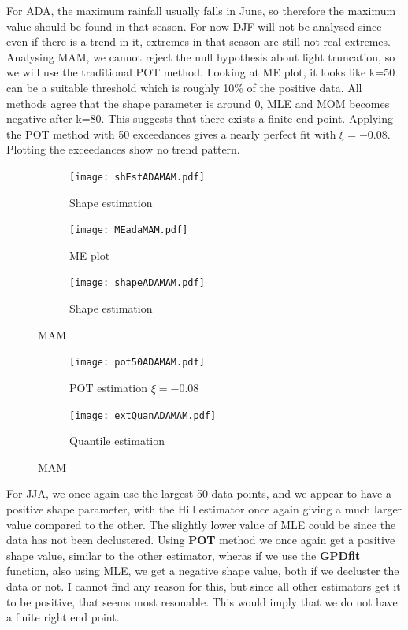 \documentclass{article}
\begin{document}
	For ADA, the maximum rainfall usually falls in June, so therefore the maximum value should be found in that season. For now DJF will not be analysed since even if there is a trend in it, extremes in that season are still not real extremes. Analysing MAM, we cannot reject the null hypothesis about light truncation, so we will use the traditional POT method. Looking at ME plot, it looks like k=50 can be a suitable threshold which is roughly 10\% of the positive data. All methods agree that the shape parameter is around 0, MLE and MOM becomes negative after k=80. This suggests that there exists a finite end point. Applying the POT method with 50 exceedances gives a nearly perfect fit with $\xi = -0.08$. Plotting the exceedances show no trend pattern.
	\begin{figure}
		\begin{subfigure}{0.33\textwidth}
			\texttt{[image: shEstADAMAM.pdf]}
			\caption{Shape estimation}
		\end{subfigure}%
		\begin{subfigure}{0.33\textwidth}
			\texttt{[image: MEadaMAM.pdf]}
			\caption{ME plot}
		\end{subfigure}
		\begin{subfigure}{0.33\textwidth}
			\texttt{[image: shapeADAMAM.pdf]}
			\caption{Shape estimation}
		\end{subfigure}
	\caption{MAM}
	\end{figure}

	\begin{figure}[H]
		\centering
		\begin{subfigure}{0.5\textwidth}
			\texttt{[image: pot50ADAMAM.pdf]}
			\caption{POT estimation $\xi = -0.08$}
		\end{subfigure}%
		\begin{subfigure}{0.5\textwidth}
			\texttt{[image: extQuanADAMAM.pdf]}
			\caption{Quantile estimation}
		\end{subfigure}
	\caption{MAM}
	\end{figure}

	For JJA, we once again use the largest 50 data points, and we appear to have a positive shape parameter, with the Hill estimator once again giving a much larger value compared to the other. The slightly lower value of MLE could be since the data has not been declustered. Using \textbf{POT} method we once again get a positive shape value, similar to the other estimator, wheras if we use the \textbf{GPDfit} function, also using MLE, we get a negative shape value, both if we decluster the data or not. I cannot find any reason for this, but since all other estimators get it to be positive, that seems most resonable. This would imply that we do not have a finite right end point. 
	
\end{document}
